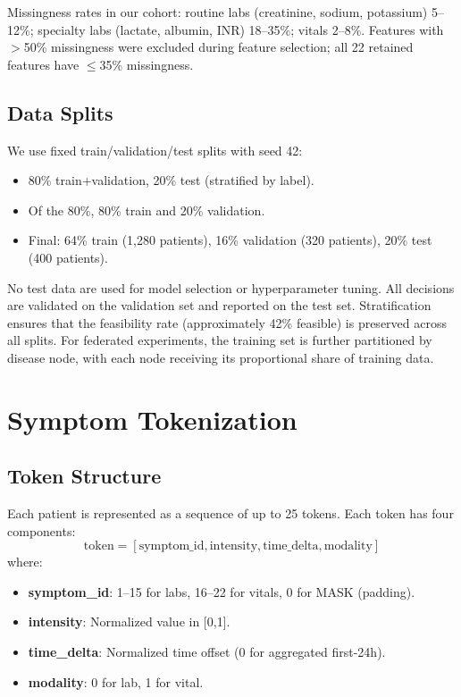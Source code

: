 Missingness rates in our cohort: routine labs (creatinine, sodium, potassium) 5--12\%; specialty labs (lactate, albumin, INR) 18--35\%; vitals 2--8\%. Features with $>$50\% missingness were excluded during feature selection; all 22 retained features have $\leq$35\% missingness.

\subsection{Data Splits}

We use fixed train/validation/test splits with seed 42:
\begin{itemize}
\item 80\% train+validation, 20\% test (stratified by label).
\item Of the 80\%, 80\% train and 20\% validation.
\item Final: 64\% train (1,280 patients), 16\% validation (320 patients), 20\% test (400 patients).
\end{itemize}
No test data are used for model selection or hyperparameter tuning. All decisions are validated on the validation set and reported on the test set. Stratification ensures that the feasibility rate (approximately 42\% feasible) is preserved across all splits. For federated experiments, the training set is further partitioned by disease node, with each node receiving its proportional share of training data.

\section{Symptom Tokenization}

\subsection{Token Structure}

Each patient is represented as a sequence of up to 25 tokens. Each token has four components:
\begin{equation}
\text{token} = [\text{symptom\_id}, \text{intensity}, \text{time\_delta}, \text{modality}]
\end{equation}
where:
\begin{itemize}
\item \textbf{symptom\_id}: 1--15 for labs, 16--22 for vitals, 0 for MASK (padding).
\item \textbf{intensity}: Normalized value in [0,1].
\item \textbf{time\_delta}: Normalized time offset (0 for aggregated first-24h).
\item \textbf{modality}: 0 for lab, 1 for vital.
\end{itemize}

